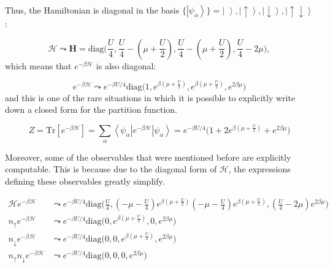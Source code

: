 Thus, the Hamiltonian is diagonal in the basis $\{\left| \psi_\alpha \right\rangle \} = \left| \,\, \right\rangle, \left|\uparrow \right\rangle, \left|\downarrow\right \rangle, \left|\uparrow \downarrow \right\rangle $:

\begin{equation}
\mathcal{H} \leadsto \bm H = \text{diag}\bigg(\frac{U}{4}, \frac{U}{4} - (\mu + \frac{U}{2} ), \frac{U}{4} - (\mu + \frac{U}{2} ), \frac{U}{4} - 2 \mu \bigg) ,
\end{equation}
which means that $e^{-\beta \mathcal{H} }$ is also diagonal:

\begin{equation}
e^{-\beta \mathcal{H} } \leadsto e^{-\beta U / 4}  \text{diag}\bigg(1,  e^{\beta(\mu + \frac{U}{2})}, e^{\beta(\mu + \frac{U}{2})},  e^{2\beta \mu} \bigg)
\end{equation}
and this is one of the rare situations in which it is possible to explicitly write down a closed form for the partition function.

\begin{equation}
Z = \text{Tr} [ e^{-\beta\mathcal{H} } ] = \sum_\alpha \left\langle \psi_\alpha \left|e^{-\beta \mathcal{H} } \right| \psi_\alpha \right\rangle = e^{-\beta U / 4} \bigg(1 + 2 e^{\beta(\mu + \frac{U}{2})} + e^{2 \beta \mu} \bigg)
\end{equation}

Moreover, some of the observables that were mentioned before are explicitly computable.
This is because due to the diagonal form of $\mathcal{H}$, the expressions defining these observables greatly simplify.

\begin{equation}
\begin{split}
\mathcal{H} e^{-\beta\mathcal{H} } &\leadsto e^{-\beta U / 4}  \text{diag}\bigg(\frac{U}{4}, (-\mu - \frac{U}{4})  e^{\beta(\mu + \frac{U}{2})} (-\mu - \frac{U}{4}) e^{\beta(\mu + \frac{U}{2})}, (\frac{U}{4} - 2\mu ) e^{2\beta \mu} \bigg) \\
n_{\uparrow} e^{-\beta\mathcal{H} } &\leadsto e^{-\beta U / 4}  \text{diag}\bigg(0, e^{\beta(\mu + \frac{U}{2})}, 0,  e^{2\beta \mu} \bigg) \\
n_{\downarrow} e^{-\beta\mathcal{H} } &\leadsto e^{-\beta U / 4}  \text{diag}\bigg(0, 0, e^{\beta(\mu + \frac{U}{2})},   e^{2\beta \mu} \bigg) \\
n_{\uparrow} n_{\downarrow} e^{-\beta\mathcal{H} } &\leadsto e^{-\beta U / 4}  \text{diag}\bigg(0, 0, 0,   e^{2\beta \mu} \bigg) \\
\end{split}
\end{equation}

